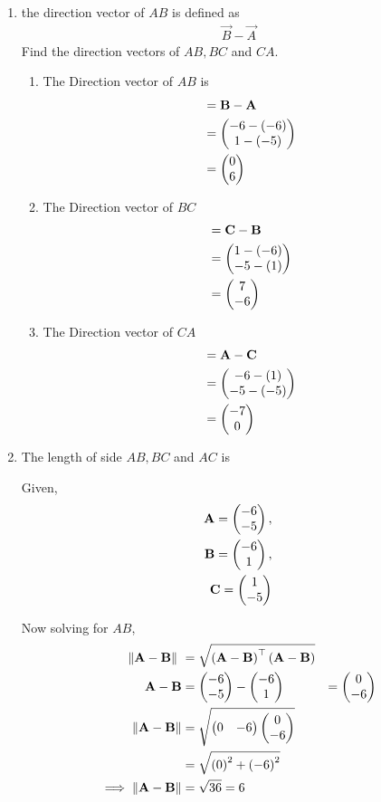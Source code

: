 \documentclass[11pt]{book}
\begin{document}
\begin{enumerate}[label=\thesection.\arabic*.,ref=\thesection.\theenumi]
\item the direction vector of $AB$ is defined as 
\begin{align}
 \vec{B}-
  \vec{A}
\end{align}
Find the direction vectors of $AB, BC$ and $CA$.
\\
\solution
\begin{enumerate} 
\item  The Direction vector of $AB$ is 
\begin{align}&= \vec{B} - \vec{A} \\
 &= \myvec{ -6  -(-6)\\ 1 - (-5) } \\&= \myvec{ 0\\ 6 }
 \end{align}
\item The Direction vector of $BC$ 
\begin{align}&= \vec{C} - \vec{B}\\
 &= \myvec{ 1 - (-6)\\ -5 - (1) } \\&= \myvec{7\\ -6 }
  \end{align}
  \item  The Direction vector of $CA$  
  \begin{align} &= \mathbf{A} - \mathbf{C} \\ 
 &= \begin{pmatrix} -6 - (1)\\ -5 - (-5) \end{pmatrix} \\&= \begin{pmatrix} -7 \\ 0 \end{pmatrix}
  \end{align}
 \end{enumerate}

 \item The length of side $AB,BC$ and $AC$ is

		\solution
Given, 
\begin{align}
\mathbf{A} = \begin{pmatrix}-6\\-5\end{pmatrix},\\
\mathbf{B} = \begin{pmatrix}-6\\1\end{pmatrix},\\
\mathbf{C} = \begin{pmatrix}1\\-5\end{pmatrix} 
\end{align}

Now solving for $AB$,\\
\begin{align}
\norm{\vec{A}-\vec{B}}\ &=  \sqrt{\brak{\vec{A}-\vec{B}}^{\top}\brak{\vec{A}-\vec{B}}} \\
	\vec{A}-\vec{B} &= \myvec{-6\\-5} - \myvec{-6\\1} &= \myvec{0\\-6}\\
\norm{\vec{A}-\vec{B}} &= \sqrt{\myvec{0 & -6}\myvec{0\\-6}}\\
&= \sqrt{\brak{0}^2 +\brak{-6}^2}\\
	\implies \norm{\vec{A}-\vec{B}} &=\sqrt{36}= 6
\end{align}


\end{enumerate}
\end{document}
